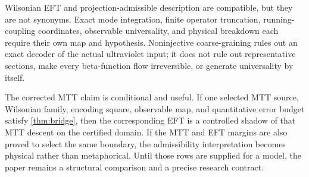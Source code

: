 \documentclass[11pt]{article}
\theoremstyle{definition}
\theoremstyle{remark}
\begin{document}
Wilsonian EFT and projection-admissible description are compatible, but they
are not synonyms.  Exact mode integration, finite operator truncation,
running-coupling coordinates, observable universality, and physical
breakdown each require their own map and hypothesis.  Noninjective
coarse-graining rules out an exact decoder of the actual ultraviolet input;
it does not rule out representative sections, make every beta-function flow
irreversible, or generate universality by itself.

The corrected MTT claim is conditional and useful.  If one selected MTT
source, Wilsonian family, encoding square, observable map, and quantitative
error budget satisfy \cref{thm:bridge}, then the corresponding EFT is a
controlled shadow of that MTT descent on the certified domain.  If the MTT
and EFT margins are also proved to select the same boundary, the
admissibility interpretation becomes physical rather than metaphorical.
Until those rows are supplied for a model, the paper remains a structural
comparison and a precise research contract.



\end{document}
